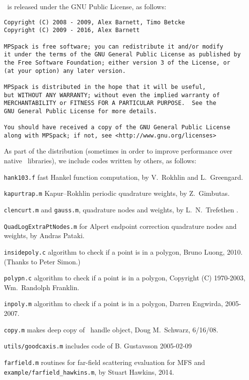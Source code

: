 \documentclass[12pt]{article}
\begin{document}
\mpspack\ is released under the GNU Public License, as follows:
\begin{verbatim}
Copyright (C) 2008 - 2009, Alex Barnett, Timo Betcke
Copyright (C) 2009 - 2016, Alex Barnett

MPSpack is free software; you can redistribute it and/or modify
it under the terms of the GNU General Public License as published by
the Free Software Foundation; either version 3 of the License, or
(at your option) any later version.

MPSpack is distributed in the hope that it will be useful,
but WITHOUT ANY WARRANTY; without even the implied warranty of
MERCHANTABILITY or FITNESS FOR A PARTICULAR PURPOSE.  See the
GNU General Public License for more details.

You should have received a copy of the GNU General Public License
along with MPSpack; if not, see <http://www.gnu.org/licenses>
\end{verbatim}

As part of the distribution (sometimes in order to
improve performance over native \matlab\ libraries),
we include codes written by others, as follows:
\bi
\item {\tt hank103.f} fast Hankel function computation, by
V.~Rokhlin and L.~Greengard.
\item {\tt kapurtrap.m} Kapur--Rokhlin periodic quadrature weights,
by Z.~Gimbutas.
\item {\tt clencurt.m} and {\tt gauss.m}, quadrature nodes and weights,
by L.~N.~Trefethen \cite{tref}.
\item {\tt QuadLogExtraPtNodes.m} for Alpert endpoint correction
quadrature nodes and weights, by Andras Pataki.
\item {\tt insidepoly.c} algorithm to check if a point is in a polygon,
Bruno Luong, 2010. (Thanks to Peter Simon.)
\item {\tt polypn.c} algorithm to check if a point is in a polygon,
Copyright (C) 1970-2003, Wm.~Randolph Franklin.
\item {\tt inpoly.m} algorithm to check if a point is in a polygon,
Darren Engwirda, 2005-2007.
\item {\tt copy.m} makes deep copy of \matlab\ handle object,
Doug M.~Schwarz, 6/16/08.
\item {\tt utils/goodcaxis.m} includes code of B. Gustavsson 2005-02-09
\item {\tt *farfield.m} routines for far-field scattering evaluation
for MFS and {\tt example/farfield\_hawkins.m}, by Stuart Hawkins, 2014.
\ei





 

\end{document}
